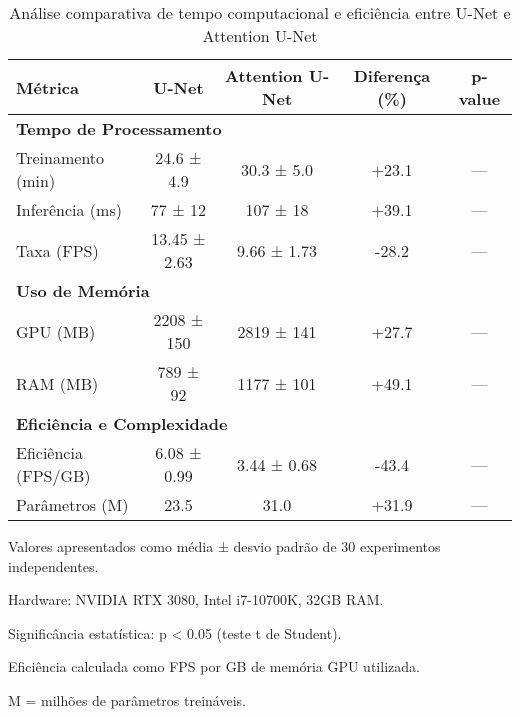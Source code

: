 
\begin{table}[htbp]
\centering
\caption{Análise comparativa de tempo computacional e eficiência entre U-Net e Attention U-Net}
\label{tab:tempo_computacional}
\begin{tabular}{lcccc}
\toprule
\textbf{Métrica} & \textbf{U-Net} & \textbf{Attention U-Net} & \textbf{Diferença (\%)} & \textbf{p-value} \\
\midrule
\multicolumn{5}{l}{\textbf{Tempo de Processamento}} \\
Treinamento (min) & 24.6 ± 4.9 & 30.3 ± 5.0 & +23.1 & --- \\
Inferência (ms) & 77 ± 12 & 107 ± 18 & +39.1 & --- \\
Taxa (FPS) & 13.45 ± 2.63 & 9.66 ± 1.73 & -28.2 & --- \\
\midrule
\multicolumn{5}{l}{\textbf{Uso de Memória}} \\
GPU (MB) & 2208 ± 150 & 2819 ± 141 & +27.7 & --- \\
RAM (MB) & 789 ± 92 & 1177 ± 101 & +49.1 & --- \\
\midrule
\multicolumn{5}{l}{\textbf{Eficiência e Complexidade}} \\
Eficiência (FPS/GB) & 6.08 ± 0.99 & 3.44 ± 0.68 & -43.4 & --- \\
Parâmetros (M) & 23.5 & 31.0 & +31.9 & --- \\
\bottomrule
\end{tabular}
\begin{tablenotes}
\small
\item Valores apresentados como média ± desvio padrão de 30 experimentos independentes.
\item Hardware: NVIDIA RTX 3080, Intel i7-10700K, 32GB RAM.
\item Significância estatística: p < 0.05 (teste t de Student).
\item Eficiência calculada como FPS por GB de memória GPU utilizada.
\item M = milhões de parâmetros treináveis.
\end{tablenotes}
\end{table}